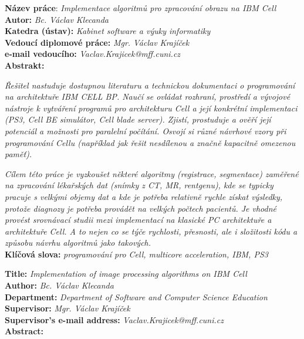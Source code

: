 \raggedbottom


\noindent
\textbf{Název práce}: \textit{Implementace algoritmů pro zpracování obrazu na IBM Cell} \\
\textbf{Autor:} \textit{Bc. Václav Klecanda} \\
\textbf{Katedra (ústav):} \textit{Kabinet software a výuky informatiky} \\
\textbf{Vedoucí diplomové práce:} \textit{Mgr. Václav Krajíček} \\
\textbf{e-mail vedoucího:} \textit{Vaclav.Krajicek@mff.cuni.cz} \\
\textbf{Abstrakt:} \\

\par
\textit{
Řešitel nastuduje dostupnou literaturu a technickou dokumentaci o programování na architektuře IBM CELL BP.
Naučí se ovládat rozhraní, prostředí a vývojové nástroje k vytváření programů pro architekturu Cell a její konkrétní implementaci (PS3, Cell BE simulátor, Cell blade server).
Zjistí, prostuduje a ověří její potenciál a možnosti pro paralelní počítání.
Osvojí si různé návrhové vzory při programování Cellu (například jak řešit nesdílenou a značně kapacitně omezenou paměť).
}

\par
\textit{
Cílem této práce je vyzkoušet některé algoritmy (registrace, segmentace) zaměřené na zpracování lékařských dat (snímky z CT, MR, rentgenu), kde se typicky pracuje s velkými objemy dat a kde je potřeba relativně rychle získat výsledky, protože diagnozy je potřeba provádět na velkých počtech pacientů.
Je vhodné provést srovnávací studii mezi implementací na klasické PC architektuře a architektuře Cell.
A to nejen co se týče rychlosti, přesnosti, ale i složitosti kódu a způsobu návrhu algoritmů jako takových.
}\\

\noindent
\textbf{Klíčová slova:} \textit{programování pro Cell, multicore acceleration, IBM, PS3} \\

\pagebreak


\noindent
\textbf{Title:} \textit{Implementation of image processing algorithms on IBM Cell} \\
\textbf{Author:} \textit{Bc. Václav Klecanda} \\
\textbf{Department:} \textit{Department of Software and Computer Science Education} \\
\textbf{Supervisor:} \textit{Mgr. Václav Krajíček} \\
\textbf{Supervisor's e-mail address:} \textit{Vaclav.Krajicek@mff.cuni.cz} \\
\textbf{Abstract:} \\

